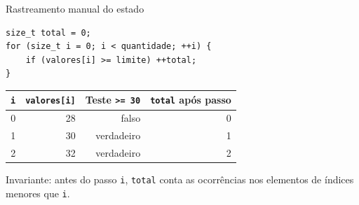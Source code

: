 \begin{frame}[fragile]{Rastreamento manual do estado}
\begin{lstlisting}
size_t total = 0;
for (size_t i = 0; i < quantidade; ++i) {
    if (valores[i] >= limite) ++total;
}
\end{lstlisting}
\begin{center}
\small
\begin{tabular}{rrrr}
\toprule
\texttt{i} & \texttt{valores[i]} & Teste \texttt{>= 30} & \texttt{total} após passo \\
\midrule
0 & 28 & falso & 0 \\
1 & 30 & verdadeiro & 1 \\
2 & 32 & verdadeiro & 2 \\
\bottomrule
\end{tabular}
\end{center}
\small Invariante: antes do passo \texttt{i}, \texttt{total} conta as ocorrências nos elementos de índices menores que \texttt{i}.
\end{frame}
